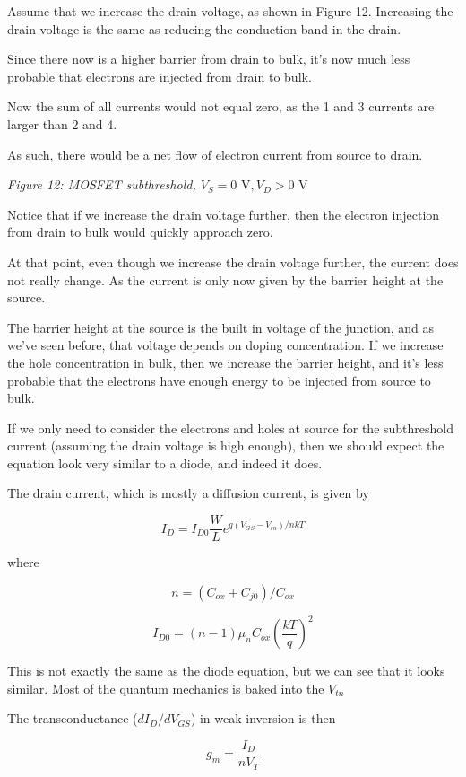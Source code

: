 Assume that we increase the drain voltage, as shown in Figure 12.
Increasing the drain voltage is the same as reducing the conduction band
in the drain.

Since there now is a higher barrier from drain to bulk, it's now much
less probable that electrons are injected from drain to bulk.

Now the sum of all currents would not equal zero, as the 1 and 3
currents are larger than 2 and 4.

As such, there would be a net flow of electron current from source to
drain.


{
\centering
{}
}

\emph{Figure 12: MOSFET subthreshold,
\(V_{S} = 0\text{ V}, V_D > 0\text{ V}\) }

Notice that if we increase the drain voltage further, then the electron
injection from drain to bulk would quickly approach zero.

At that point, even though we increase the drain voltage further, the
current does not really change. As the current is only now given by the
barrier height at the source.

The barrier height at the source is the built in voltage of the
junction, and as we've seen before, that voltage depends on doping
concentration. If we increase the hole concentration in bulk, then we
increase the barrier height, and it's less probable that the electrons
have enough energy to be injected from source to bulk.

If we only need to consider the electrons and holes at source for the
subthreshold current (assuming the drain voltage is high enough), then
we should expect the equation look very similar to a diode, and indeed
it does.

The drain current, which is mostly a diffusion current, is given by

\[ I_{D} = I_{D0} \frac{W}{L} e^{q(V_{GS} - V_{tn})/ n kT} \]

where

\[ n = (C_{ox} + C_{j0})/C_{ox} \]

\[ I_{D0} = (n - 1) \mu_n C_{ox} \left(\frac{kT}{q}\right)^2 \]

This is not exactly the same as the diode equation, but we can see that
it looks similar. Most of the quantum mechanics is baked into the
\(V_{tn}\)

The transconductance (\(dI_D/dV_{GS}\)) in weak inversion is then

\[ g_m = \frac{I_D}{nV_T} \]

